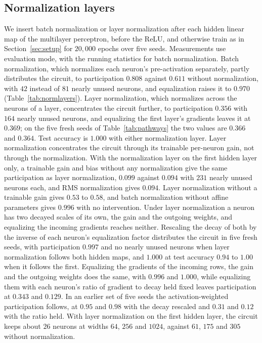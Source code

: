 \documentclass{article} %
\begin{document}
\subsection{Normalization layers}
\label{app:normlayers}
We insert batch normalization \citep{ioffe2015batchnorm} or layer normalization \citep{ba2016layernorm} after each hidden linear map of the multilayer perceptron, before the ReLU, and otherwise train as in Section~\ref{sec:setup} for $20{,}000$ epochs over five seeds. Measurements use evaluation mode, with the running statistics for batch normalization. Batch normalization, which normalizes each neuron's pre-activation separately, partly distributes the circuit, to participation $0.808$ against $0.611$ without normalization, with $42$ instead of $81$ nearly unused neurons, and equalization raises it to $0.970$ (Table~\ref{tab:normlayers}). Layer normalization, which normalizes across the neurons of a layer, concentrates the circuit further, to participation $0.356$ with $164$ nearly unused neurons, and equalizing the first layer's gradients leaves it at $0.369$; on the five fresh seeds of Table~\ref{tab:pathways} the two values are $0.366$ and $0.364$. Test accuracy is $1.000$ with either normalization layer. Layer normalization concentrates the circuit through its trainable per-neuron gain, not through the normalization. With the normalization layer on the first hidden layer only, a trainable gain and bias without any normalization give the same participation as layer normalization, $0.099$ against $0.094$ with $231$ nearly unused neurons each, and RMS normalization gives $0.094$. Layer normalization without a trainable gain gives $0.53$ to $0.58$, and batch normalization without affine parameters gives $0.996$ with no intervention. Under layer normalization a neuron has two decayed scales of its own, the gain and the outgoing weights, and equalizing the incoming gradients reaches neither. Rescaling the decay of both by the inverse of each neuron's equalization factor distributes the circuit in five fresh seeds, with participation $0.997$ and no nearly unused neurons when layer normalization follows both hidden maps, and $1.000$ at test accuracy $0.94$ to $1.00$ when it follows the first. Equalizing the gradients of the incoming rows, the gain and the outgoing weights does the same, with $0.996$ and $1.000$, while equalizing them with each neuron's ratio of gradient to decay held fixed leaves participation at $0.343$ and $0.129$. In an earlier set of five seeds the activation-weighted participation follows, at $0.95$ and $0.98$ with the decay rescaled and $0.31$ and $0.12$ with the ratio held. With layer normalization on the first hidden layer, the circuit keeps about $26$ neurons at widths $64$, $256$ and $1024$, against $61$, $175$ and $305$ without normalization.
\end{document}
